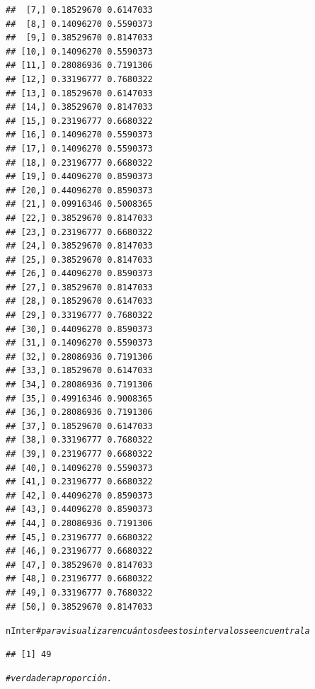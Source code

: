 \documentclass[12pt,letterpaper]{article}\usepackage[]{graphicx}\usepackage[]{color}
\makeatletter
\newcommand{\hlcom}[1]{\textcolor[rgb]{0.678,0.584,0.686}{\textit{#1}}}%
\newcommand{\hlstd}[1]{\textcolor[rgb]{0.345,0.345,0.345}{#1}}%
\newenvironment{kframe}{%
 \def\at@end@of@kframe{}%
 \ifinner\ifhmode%
  \def\at@end@of@kframe{\end{minipage}}%
  \begin{minipage}{\columnwidth}%
 \fi\fi%
 \def\FrameCommand##1{\hskip\@totalleftmargin \hskip-\fboxsep
 \colorbox{shadecolor}{##1}\hskip-\fboxsep
     \hskip-\linewidth \hskip-\@totalleftmargin \hskip\columnwidth}%
 \MakeFramed {\advance\hsize-\width
   \@totalleftmargin\z@ \linewidth\hsize
   \@setminipage}}%
 {\par\unskip\endMakeFramed%
 \at@end@of@kframe}
\newenvironment{knitrout}{}{} %
\makeatother
\begin{document}
\begin{knitrout}
\begin{kframe}
\begin{verbatim}
##  [7,] 0.18529670 0.6147033
##  [8,] 0.14096270 0.5590373
##  [9,] 0.38529670 0.8147033
## [10,] 0.14096270 0.5590373
## [11,] 0.28086936 0.7191306
## [12,] 0.33196777 0.7680322
## [13,] 0.18529670 0.6147033
## [14,] 0.38529670 0.8147033
## [15,] 0.23196777 0.6680322
## [16,] 0.14096270 0.5590373
## [17,] 0.14096270 0.5590373
## [18,] 0.23196777 0.6680322
## [19,] 0.44096270 0.8590373
## [20,] 0.44096270 0.8590373
## [21,] 0.09916346 0.5008365
## [22,] 0.38529670 0.8147033
## [23,] 0.23196777 0.6680322
## [24,] 0.38529670 0.8147033
## [25,] 0.38529670 0.8147033
## [26,] 0.44096270 0.8590373
## [27,] 0.38529670 0.8147033
## [28,] 0.18529670 0.6147033
## [29,] 0.33196777 0.7680322
## [30,] 0.44096270 0.8590373
## [31,] 0.14096270 0.5590373
## [32,] 0.28086936 0.7191306
## [33,] 0.18529670 0.6147033
## [34,] 0.28086936 0.7191306
## [35,] 0.49916346 0.9008365
## [36,] 0.28086936 0.7191306
## [37,] 0.18529670 0.6147033
## [38,] 0.33196777 0.7680322
## [39,] 0.23196777 0.6680322
## [40,] 0.14096270 0.5590373
## [41,] 0.23196777 0.6680322
## [42,] 0.44096270 0.8590373
## [43,] 0.44096270 0.8590373
## [44,] 0.28086936 0.7191306
## [45,] 0.23196777 0.6680322
## [46,] 0.23196777 0.6680322
## [47,] 0.38529670 0.8147033
## [48,] 0.23196777 0.6680322
## [49,] 0.33196777 0.7680322
## [50,] 0.38529670 0.8147033
\end{verbatim}
\begin{alltt}
\hlstd{nInter} \hlcom{# para visualizar en cuántos de estos intervalos se encuentra la }
\end{alltt}
\begin{verbatim}
## [1] 49
\end{verbatim}
\begin{alltt}
\hlcom{# verdadera proporción.}
\end{alltt}
\end{kframe}
\end{knitrout}
\end{document}
